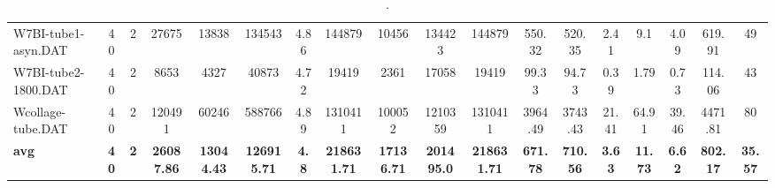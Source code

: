 \begin{sidewaystable}[h]
{\begin{tabular}{lccccccccccccccccc}
W7BI-tube1-asyn.DAT & 40 & 2 & 27675 & 13838 & 134543 & 4.86 & 144879 & 10456 & 134423 & 144879 & 550.32 & 520.35 & 2.41 & 9.1 & 4.09 & 619.91 & 49\\
W7BI-tube2-1800.DAT & 40 & 2 & 8653 & 4327 & 40873 & 4.72 & 19419 & 2361 & 17058 & 19419 & 99.33 & 94.73 & 0.39 & 1.79 & 0.73 & 114.06 & 43\\
Wcollage-tube.DAT & 40 & 2 & 120491 & 60246 & 588766 & 4.89 & 1310411 & 100052 & 1210359 & 1310411 & 3964.49 & 3743.43 & 21.41 & 64.91 & 39.46 & 4471.81 & 80\\
\cline{1-18} \textbf{avg} & \textbf{40} & \textbf{2} & \textbf{26087.86} & \textbf{13044.43} & \textbf{126915.71} & \textbf{4.8} & \textbf{218631.71} & \textbf{17136.71} & \textbf{201495.0} & \textbf{218631.71} & \textbf{671.78} & \textbf{710.56} & \textbf{3.63} & \textbf{11.73} & \textbf{6.62} & \textbf{802.17} & \textbf{35.57} \\ \cline{1-18}
\bottomrule
\end{tabular}%
}%
\caption{.}
\label{tab:table_bc}
\end{sidewaystable}


